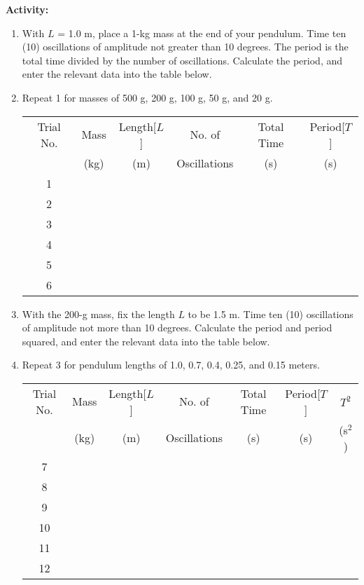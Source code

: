 {\noindent \bf Activity:} \begin{enumerate}

\item With $L$ = 1.0 m, place a 1-kg mass at the end of your pendulum. Time ten (10) oscillations of amplitude not greater than 10 degrees. The period is the total time divided by the number of oscillations. Calculate the period, and enter the relevant data into the table below.

\item Repeat 1 for masses of 500 g, 200 g, 100 g, 50 g, and 20 g.

\begin{center} \begin{tabular}{|c|c|c|c|c|c|} \hline Trial No. & Mass & Length[$L$] & No. of & Total Time & Period[$T$] \\ & (kg) & (m) & Oscillations & (s) & (s) \\ \hline \hline 1 & & & & & \\ \hline 2 & & & & & \\ \hline 3 & & & & & \\ \hline 4 & & & & & \\ \hline 5 & & & & & \\ \hline 6 & & & & & \\ \hline \end{tabular} \end{center}

\item With the 200-g mass, fix the length $L$ to be 1.5 m. Time ten (10) oscillations of amplitude not more than 10 degrees. Calculate the period and period squared, and enter the relevant data into the table below.

\item Repeat 3 for pendulum lengths of 1.0, 0.7, 0.4, 0.25, and 0.15 meters.

\begin{center} \begin{tabular}{|c|c|c|c|c|c|c|} \hline Trial No. & Mass & Length[$L$] & No. of & Total Time & Period[$T$] & $T^2$ \\ & (kg) & (m) & Oscillations & (s) & (s) & (s$^2$) \\ \hline \hline 7 & & & & & & \\ \hline 8 & & & & & & \\ \hline 9 & & & & & & \\ \hline 10 & & & & & & \\ \hline 11 & & & & & & \\ \hline 12 & & & & & & \\ \hline \end{tabular} \end{center}


\end{enumerate}
